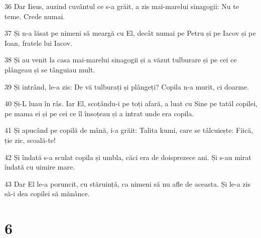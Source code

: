 \par 36 Dar Iisus, auzind cuvântul ce s-a grăit, a zis mai-marelui sinagogii: Nu te teme. Crede numai.
\par 37 Și n-a lăsat pe nimeni să meargă cu El, decât numai pe Petru și pe Iacov și pe Ioan, fratele lui Iacov.
\par 38 Și au venit la casa mai-marelui sinagogii și a văzut tulburare și pe cei ce plângeau și se tânguiau mult.
\par 39 Și intrând, le-a zis: De vă tulburați și plângeți? Copila n-a murit, ci doarme.
\par 40 Și-L luau în râs. Iar El, scoțându-i pe toți afară, a luat cu Sine pe tatăl copilei, pe mama ei și pe cei ce îl însoțeau și a intrat unde era copila.
\par 41 Și apucând pe copilă de mână, i-a grăit: Talita kumi, care se tâlcuiește: Fiică, ție zic, scoală-te!
\par 42 Și îndată s-a sculat copila și umbla, căci era de doisprezece ani. Și s-au mirat îndată cu uimire mare.
\par 43 Dar El le-a poruncit, cu stăruință, ca nimeni să nu afle de aceasta. Și le-a zis să-i dea copilei să mănânce.

\chapter{6}

